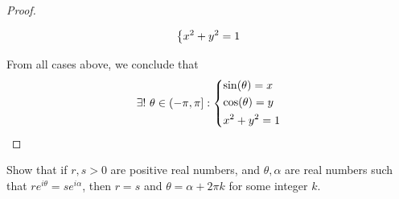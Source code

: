 \begin{proof}
\begin{itemize}
\begin{align*}
\begin{dcases}
                                                          x^2 + y^2 = 1
                                                        \end{dcases}
          \end{align*}
  \end{itemize}
  From all cases above, we conclude that
  \[
    \exists!\ \theta \in (-\pi, \pi] : \begin{dcases}
      \sin(\theta) = x \\
      \cos(\theta) = y \\
      x^2 + y^2 = 1
    \end{dcases}
  \]
\end{proof}

\begin{ex}\label{ii:ex:4.7.5}
  Show that if \(r, s > 0\) are positive real numbers, and \(\theta, \alpha\) are real numbers such that \(r e^{i \theta} = s e^{i \alpha}\), then \(r = s\) and \(\theta = \alpha + 2 \pi k\) for some integer \(k\).
\end{ex}

